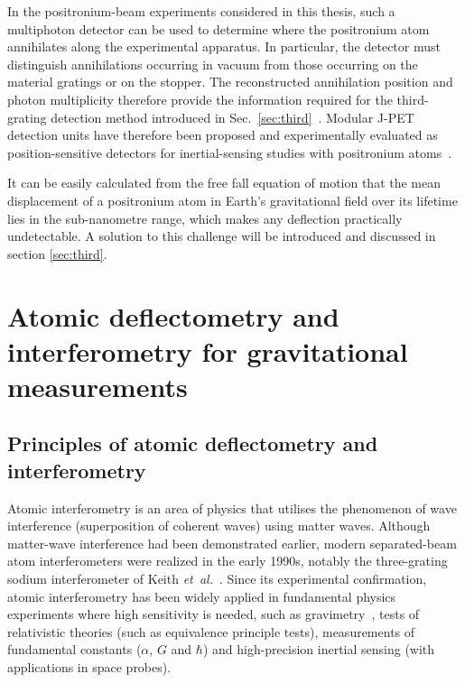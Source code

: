\documentclass[12pt]{report}
\begin{document}
In the positronium-beam experiments considered in this thesis, such a multiphoton detector can be used to determine where the positronium atom annihilates along the experimental apparatus. In particular, the detector must distinguish annihilations occurring in vacuum from those occurring on the material gratings or on the stopper. The reconstructed annihilation position and photon multiplicity therefore provide the information required for the third-grating detection method introduced in Sec.~\ref{sec:third}~\cite{Sharma_Povolo_Mariazzi_Korcyl_Kacprzak_Kumar_Niedźwiecki_Baran_Beyene_Brusa_etal._2024}.
Modular J-PET detection units have therefore been proposed and experimentally evaluated as position-sensitive detectors for inertial-sensing studies with positronium atoms~\cite{Sharma_Povolo_Mariazzi_Korcyl_Kacprzak_Kumar_Niedźwiecki_Baran_Beyene_Brusa_etal._2024}.

It can be easily calculated from the free fall equation of motion that the mean displacement of a positronium atom in Earth's gravitational field over its lifetime lies in the sub-nanometre range, which makes any deflection practically undetectable. 
A solution to this challenge will be introduced and discussed in section \ref{sec:third}.

\chapter{Atomic deflectometry and interferometry for gravitational measurements}

\section{Principles of atomic deflectometry and interferometry}

Atomic interferometry is an area of physics that utilises the phenomenon of wave interference (superposition of coherent waves) using matter waves. 
Although matter-wave interference had been demonstrated earlier, modern separated-beam atom interferometers were realized in the early 1990s, notably the three-grating sodium interferometer of Keith \emph{et~al.}~\cite{Keith1991}.
Since its experimental confirmation, atomic interferometry has been widely applied in fundamental physics experiments where high sensitivity is needed, such as gravimetry~\cite{Vovrosh_Dragomir_Stray_Boddice_2023}, tests of relativistic theories (such as equivalence principle tests), measurements of fundamental constants (\(\alpha\), \(G\) and \(\hbar\)) and high-precision inertial sensing (with applications in space probes).
% 
\end{document}
